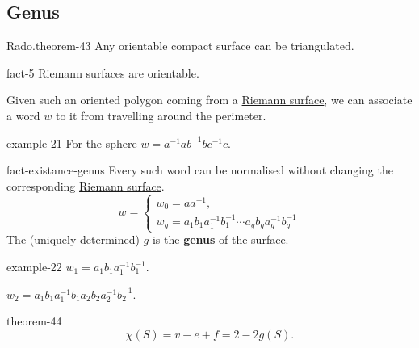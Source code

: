 \documentclass[10pt,]{book}
\newcommand{\terminology}[1]{\textbf{#1}}
\numberwithin{equation}{section}
\newcommand{\inv}{^{-1}}
\begin{document}
\subsection[{Genus}]{Genus}\label{subsection-47}
\begin{theorem}{Rado.}{}{theorem-43}%
\hypertarget{p-501}{}%
Any orientable compact surface can be triangulated.%
\end{theorem}
\begin{fact}{}{}{fact-5}%
\hypertarget{p-502}{}%
Riemann surfaces are orientable.%
\end{fact}
\hypertarget{p-503}{}%
Given such an oriented polygon coming from a \hyperref[def-top-riem-surface]{Riemann surface}, we can associate a word \(w\) to it from travelling around the perimeter.%
\begin{example}{}{example-21}%
\hypertarget{p-504}{}%
For the sphere \(w = a\inv ab\inv bc\inv c\).%
\end{example}
\begin{fact}{}{}{fact-existance-genus}%
\hypertarget{p-505}{}%
Every such word can be normalised without changing the corresponding \hyperref[def-top-riem-surface]{Riemann surface}.%
\begin{equation*}
w = \begin{cases} w_0 = aa\inv,\\ w_g = a_1b_1 a_1\inv b_1\inv \cdots a_gb_g a_g\inv b_g\inv\end{cases}
\end{equation*}
The (uniquely determined) \(g\) is the \terminology{genus} of the surface.%
\end{fact}
\begin{example}{}{example-22}%
\hypertarget{p-506}{}%
\(w_1 = a_1b_1 a_1\inv b_1 \inv\).%
\par
\hypertarget{p-507}{}%
\(w_2 = a_1b_1 a_1\inv b_1a_2b_2 a_2\inv b_2 \inv\).%
\end{example}
\begin{theorem}{}{}{theorem-44}%
\hypertarget{p-508}{}%
%
\begin{equation*}
\chi (S) = v- e + f = 2-2g(S)\text{.}
\end{equation*}
%
\end{theorem}
%
%
\typeout{************************************************}
\typeout{************************************************}
%
\end{document}
